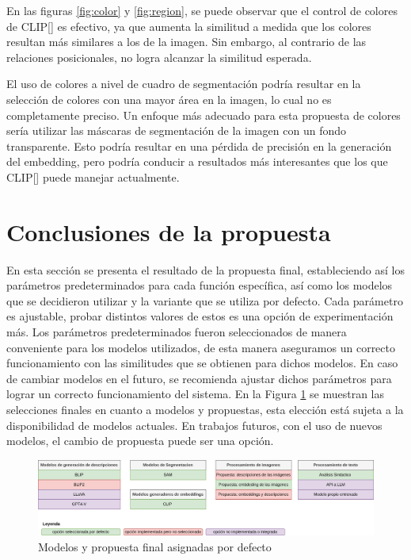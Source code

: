 En las figuras \ref{fig:color} y \ref{fig:region}, se puede observar que el control de colores de CLIP[\cite{clip}] es efectivo, ya que aumenta la similitud a medida que los colores resultan más similares a los de la imagen. Sin embargo, al contrario de las relaciones posicionales, no logra alcanzar la similitud esperada.

El uso de colores a nivel de cuadro de segmentación podría resultar en la selección de colores con una mayor área en la imagen, lo cual no es completamente preciso. Un enfoque más adecuado para esta propuesta de colores sería utilizar las máscaras de segmentación de la imagen con un fondo transparente. Esto podría resultar en una pérdida de precisión en la generación del embedding, pero podría conducir a resultados más interesantes que los que CLIP[\cite{clip}] puede manejar actualmente.


\section{Conclusiones de la propuesta}
En esta sección se presenta el resultado de la propuesta final, estableciendo así los parámetros predeterminados para cada función específica, así como los modelos que se decidieron utilizar y la variante que se utiliza por defecto. Cada parámetro es ajustable, probar distintos valores de estos es una opción de experimentación más. Los parámetros predeterminados fueron seleccionados de manera conveniente para los modelos utilizados, de esta manera aseguramos un correcto funcionamiento con las similitudes que se obtienen para dichos modelos. En caso de cambiar modelos en el futuro, se recomienda ajustar dichos parámetros para lograr un correcto funcionamiento del sistema. En la Figura \ref{fig:propuestafinal} se muestran las selecciones finales en cuanto a modelos y propuestas, esta elección está sujeta a la disponibilidad de modelos actuales. En trabajos futuros, con el uso de nuevos modelos, el cambio de propuesta puede ser una opción.

\begin{figure}[H]
    \centering
     \includegraphics[width=\textwidth]{Graphics/PropuestaFinal.drawio.png}
     \caption{Modelos y propuesta final asignadas por defecto }
\label{fig:propuestafinal}
\end{figure}

